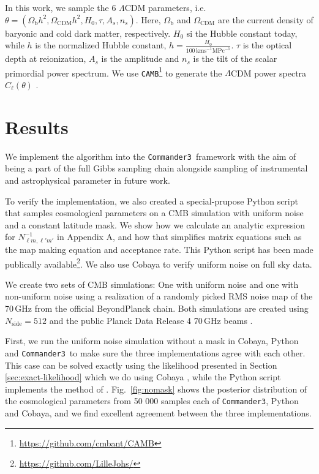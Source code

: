 \documentclass[twocolumn]{../common/aa}
\def\commanderthree{\texttt{Commander3}}
\begin{document}
In this work, we sample the 6 $\Lambda$CDM parameters, i.e. $\theta=(\Omega_{\textrm{b}}h^2, \Omega_{\textrm{CDM}}h^2, H_0, \tau, A_s, n_s)$. Here, $\Omega_\mathrm{b}$ and $\Omega_\mathrm{CDM}$ are the current density of baryonic and cold dark matter, respectively. $H_0$ si the Hubble constant today, while $h$ is the normalized Hubble constant, $h=\frac{H_0}{100\,\mathrm{km s}^{-1} \mathrm{MPc}^{-1}}$. $\tau$ is the optical depth at reionization, $A_s$ is the amplitude and $n_s$ is the tilt of the scalar primordial power spectrum. We use \texttt{CAMB}\footnote{\url{https://github.com/cmbant/CAMB}} to generate the $\Lambda$CDM power spectra $C_{\ell}(\theta)$ \citep{Lewis:1999bs}.


\section{Results}
\label{sec:results}

We implement the algorithm into the \commanderthree\ framework with the aim of being a part of the full Gibbs sampling chain alongside sampling of instrumental and astrophysical parameter in future work.

To verify the implementation, we also created a special-prupose Python script that samples cosmological parameters on a CMB simulation with uniform noise and a constant latitude mask. We show how we calculate an analytic expression for $N^{-1}_{\ell m, \ell' m'}$ in Appendix A, and how that simplifies matrix equations such as the map making equation and acceptance rate. This Python script has been made publically available\footnote{\url{https://github.com/LilleJohs/}}. We also use Cobaya \citep{Torrado:2020dgo} to verify uniform noise on full sky data.

We create two sets of CMB simulations: One with uniform noise and one with non-uniform noise using a realization of a randomly picked RMS noise map of the 70\,GHz from the official BeyondPlanck chain. Both simulations are created using $N_{\textrm{side}}=512$ and the public Planck Data Release 4 70\,GHz beams \citep{npipe}.

First, we run the uniform noise simulation without a mask in Cobaya, Python and \commanderthree\ to make sure the three implementations agree with each other. This case can be solved exactly using the likelihood presented in Section \ref{sec:exact-likelihood} which we do using Cobaya \citep{Torrado:2020dgo}, while the Python script implements the method of \citet{racine:2016}. Fig.~\ref{fig:nomask} shows the posterior distribution of the cosmological parameters from 50 000 samples each of \commanderthree, Python and Cobaya, and we find excellent agreement between the three implementations.
\end{document}
